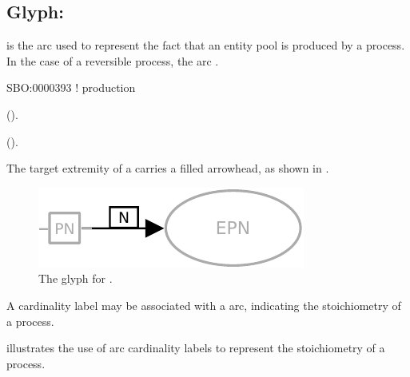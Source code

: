 \subsection{Glyph: }
\label{sec:production}

 is the arc used to represent the fact that an entity pool is produced by a process. In the case of a reversible process, the  arc .

\begin{glyphDescription}

\glyphSboTerm
SBO:0000393 ! production

\glyphOrigin
{}  ().

\glyphTarget
{}  ().

\glyphSymbol
The target extremity of a  carries a filled arrowhead, as shown in .

\end{glyphDescription}

\begin{figure}[H]
  \centering
  \includegraphics{images/production}
  \caption{The \PD glyph for .}
  \label{fig:production}
\end{figure}

A cardinality label may be associated with a  arc, indicating the stoichiometry of a process.

 illustrates the use of  arc cardinality labels to represent the stoichiometry of a process.

